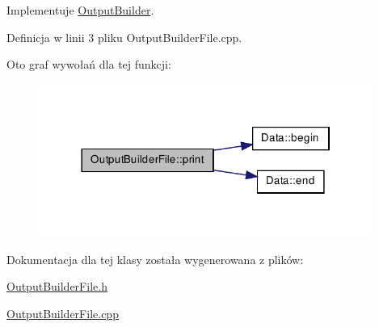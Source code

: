 \-Implementuje \hyperlink{class_output_builder_a5609a1e125b92c4d492724db53ffdf98}{\-Output\-Builder}.



\-Definicja w linii 3 pliku \-Output\-Builder\-File.\-cpp.



\-Oto graf wywołań dla tej funkcji\-:\nopagebreak
\begin{figure}[H]
\begin{center}
\leavevmode
\includegraphics[width=310pt]{class_output_builder_file_a0906f1b222f169060fbdbb3d1026b897_cgraph}
\end{center}
\end{figure}




\-Dokumentacja dla tej klasy została wygenerowana z plików\-:\begin{DoxyCompactItemize}
\item 
\hyperlink{_output_builder_file_8h}{\-Output\-Builder\-File.\-h}\item 
\hyperlink{_output_builder_file_8cpp}{\-Output\-Builder\-File.\-cpp}\end{DoxyCompactItemize}
